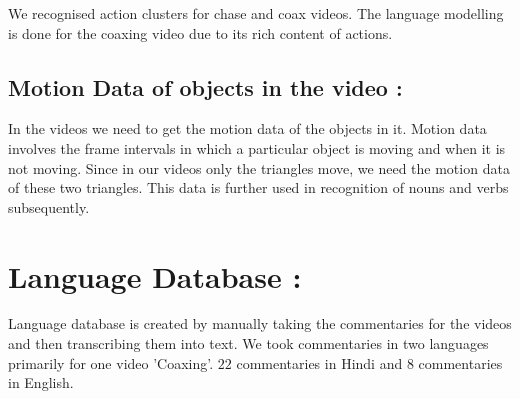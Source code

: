 \def\DevnagVersion{2.15}\documentclass[a4paper, 11pt, notitlepage]{report}
\begin{document}
We recognised action clusters for chase and coax videos. The language modelling is done for the coaxing video due to its rich content of actions.
\subsection{Motion Data of objects in the video :}
In the videos we need to get the motion data of the objects in it. Motion data involves the frame intervals in which a particular object is moving and when it is not moving. Since in our videos only the triangles move, we need the motion data of these two triangles. This data is further used in recognition of nouns and verbs subsequently.

\hspace*{10pt} \section{Language Database : } Language database is created by manually taking the commentaries for the videos and then transcribing them into text. We took commentaries in two languages primarily for one video 'Coaxing'. $22$ commentaries in Hindi and $8$ commentaries in English.
\end{document}
